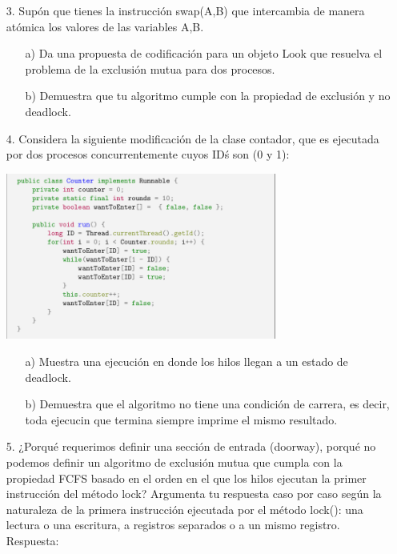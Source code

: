 \documentclass[12pt, letterpaper]{article}
\begin{document}
\begin{itemize}
\item[3. ]Sup\'on que tienes la instrucci\'on swap(A,B) que intercambia de manera at\'omica los valores de las variables A,B.

\begin{itemize}
\item[a) ]Da una propuesta de codificaci\'on para un objeto Look que resuelva el problema de la exclusi\'on mutua para dos procesos.
\item[b) ]Demuestra que tu algoritmo cumple con la propiedad de exclusi\'on y no deadlock.
\end{itemize}

\item[4. ] Considera la siguiente modificaci\'on de la clase contador, que es ejecutada por dos procesos concurrentemente cuyos ID\' s son (0 y 1):


\begin{center}
\includegraphics[width=0.7\textwidth]{CounterCode.png}\\
\end{center}


\begin{itemize}
\item[a) ]Muestra una ejecuci\'on en donde los hilos llegan a un estado de deadlock. 

\item[b) ] Demuestra que el algoritmo no tiene una condici\'on de carrera, es decir, toda ejecucin que termina siempre imprime el mismo resultado.
\end{itemize}



\item[5. ]¿Porqu\'e requerimos definir una secci\'on de entrada (doorway), porqu\'e no podemos definir un algoritmo de exclusi\'on mutua que cumpla con la propiedad FCFS basado en el orden en el que los hilos ejecutan la primer instrucción del m\'etodo lock? Argumenta tu respuesta caso por caso seg\'un la naturaleza de la primera instrucción ejecutada por el método lock(): una lectura o una
escritura, a registros separados o a un mismo registro.\\
Respuesta:\\


\end{itemize}
\end{document}
